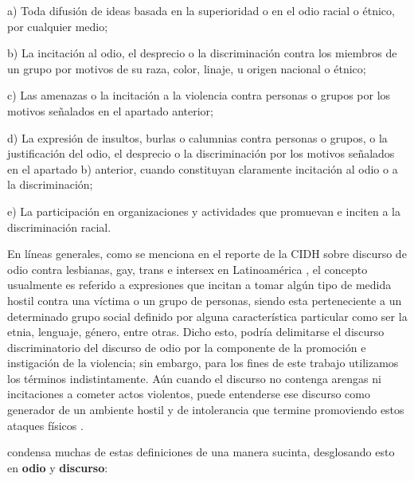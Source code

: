 \begin{displayquote}

    a) Toda difusión de ideas basada en la superioridad o en el odio racial o étnico, por cualquier medio;

    b) La incitación al odio, el desprecio o la discriminación contra los miembros de un grupo por motivos de su raza, color, linaje, u origen nacional o étnico;

    c) Las amenazas o la incitación a la violencia contra personas o grupos por los motivos señalados en el apartado anterior;

    d) La expresión de insultos, burlas o calumnias contra personas o grupos, o la justificación del odio, el desprecio o la discriminación por los motivos señalados en el apartado b) anterior, cuando constituyan claramente incitación al odio o a la discriminación;

    e) La participación en organizaciones y actividades que promuevan e inciten a la discriminación racial.
\end{displayquote}


En líneas generales, como se menciona en el reporte de la CIDH sobre discurso de odio contra lesbianas, gay, trans e intersex en Latinoamérica \cite{CIDH2015}, el concepto usualmente es referido a expresiones que incitan a tomar algún tipo de medida hostil contra una víctima o un grupo de personas, siendo esta perteneciente a un determinado grupo social definido por alguna característica particular como ser la etnia, lenguaje, género, entre otras. Dicho esto, podría delimitarse el discurso discriminatorio del discurso de odio por la componente de la promoción e instigación de la violencia; sin embargo, para los fines de este trabajo utilizamos los términos indistintamente. Aún cuando el discurso no contenga arengas ni incitaciones a cometer actos violentos, puede entenderse ese discurso como generador de un ambiente hostil y de intolerancia que termine promoviendo estos ataques físicos \cite{CIDH2015}.

\citet{article192015} condensa muchas de estas definiciones de una manera sucinta, desglosando esto en \textbf{odio} y \textbf{discurso}:

